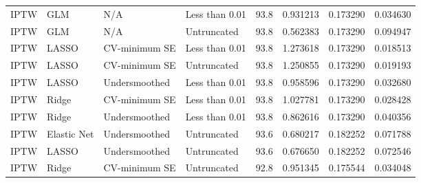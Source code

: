 \begin{longtable}[l]{llllllll}
IPTW & GLM & N/A & Less than 0.01 & 93.8 & 0.931213 & 0.173290 & 0.034630\\
IPTW & GLM & N/A & Untruncated & 93.8 & 0.562383 & 0.173290 & 0.094947\\
IPTW & LASSO & CV-minimum SE & Less than 0.01 & 93.8 & 1.273618 & 0.173290 & 0.018513\\
IPTW & LASSO & CV-minimum SE & Untruncated & 93.8 & 1.250855 & 0.173290 & 0.019193\\
IPTW & LASSO & Undersmoothed & Less than 0.01 & 93.8 & 0.958596 & 0.173290 & 0.032680\\
IPTW & Ridge & CV-minimum SE & Less than 0.01 & 93.8 & 1.027781 & 0.173290 & 0.028428\\
IPTW & Ridge & Undersmoothed & Less than 0.01 & 93.8 & 0.862616 & 0.173290 & 0.040356\\
IPTW & Elastic Net & Undersmoothed & Untruncated & 93.6 & 0.680217 & 0.182252 & 0.071788\\
IPTW & LASSO & Undersmoothed & Untruncated & 93.6 & 0.676650 & 0.182252 & 0.072546\\
IPTW & Ridge & CV-minimum SE & Untruncated & 92.8 & 0.951345 & 0.175544 & 0.034048\\
\bottomrule
\end{longtable}
